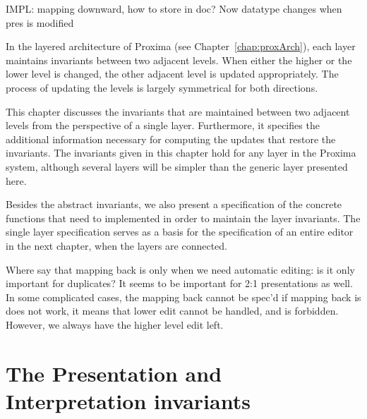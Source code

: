 IMPL: mapping downward, how to store in doc? Now datatype changes when pres is modified

\ec



In the layered architecture of Proxima (see Chapter~\ref{chap:proxArch}), each layer maintains invariants between two adjacent levels. When either the higher or the lower level is changed, the other adjacent level is updated appropriately. The process of updating the levels is largely symmetrical for both directions.

This chapter discusses the invariants that are maintained between two adjacent levels from the perspective of a single layer. Furthermore, it specifies the additional information necessary for computing the updates that restore the invariants. The invariants given in this chapter hold for any layer in the Proxima system, although several layers will be simpler than the generic layer presented here.

Besides the abstract invariants, we also present a specification of the concrete functions that need to implemented in order to maintain the layer invariants. The single layer specification serves as a basis for the specification of an entire editor in the next chapter, when the layers are connected.




\bc
Where say that mapping back is only when we need automatic editing: is it only important for duplicates? It seems to be important for 2:1 presentations as well.  In some complicated cases, the mapping back cannot be spec'd if mapping back is does not work, it means that lower edit cannot be handled, and is forbidden. However, we always have the higher level edit left.
\ec

%																
%																
%																
\section{The Presentation and Interpretation invariants}

